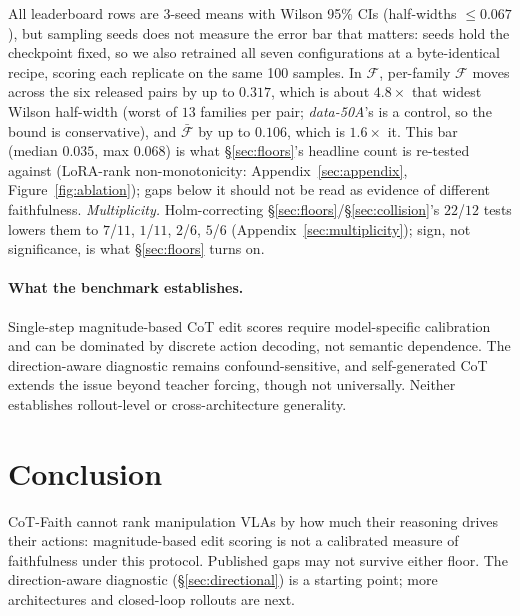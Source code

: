 \documentclass{article}
\begin{document}
All leaderboard rows are 3-seed means with Wilson 95\% CIs (half-widths $\leq 0.067$), but sampling seeds does not measure the error bar that matters: seeds hold the checkpoint fixed, so we also retrained all seven configurations at a byte-identical recipe, scoring each replicate on the same 100 samples. In $\mathcal{F}$, per-family $\mathcal{F}$ moves across the six released pairs by up to $\mathbf{0.317}$, which is about $4.8\times$ that widest Wilson half-width (worst of $13$ families per pair; \emph{data-50A}'s is a control, so the bound is conservative), and $\bar{\mathcal{F}}$ by up to $0.106$, which is $1.6\times$ it. This bar (median $0.035$, max $0.068$) is what \S\ref{sec:floors}'s headline count is re-tested against (LoRA-rank non-monotonicity: Appendix~\ref{sec:appendix}, Figure~\ref{fig:ablation}); gaps below it should not be read as evidence of different faithfulness. \emph{Multiplicity.} Holm-correcting \S\ref{sec:floors}/\S\ref{sec:collision}'s $22$/$12$ tests lowers them to $7$/$11$, $1$/$11$, $2$/$6$, $5$/$6$ (Appendix~\ref{sec:multiplicity}); sign, not significance, is what \S\ref{sec:floors} turns on.

\enlargethispage{2\baselineskip}
\paragraph{What the benchmark establishes.} Single-step magnitude-based CoT edit scores require model-specific calibration and can be dominated by discrete action decoding, not semantic dependence. The direction-aware diagnostic remains confound-sensitive, and self-generated CoT extends the issue beyond teacher forcing, though not universally. Neither establishes rollout-level or cross-architecture generality.

\section{Conclusion}

CoT-Faith cannot rank manipulation VLAs by how much their reasoning drives their actions: magnitude-based edit scoring is not a calibrated measure of faithfulness under this protocol. Published gaps may not survive either floor. The direction-aware diagnostic (\S\ref{sec:directional}) is a starting point; more architectures and closed-loop rollouts are next.

\FloatBarrier
\end{document}
